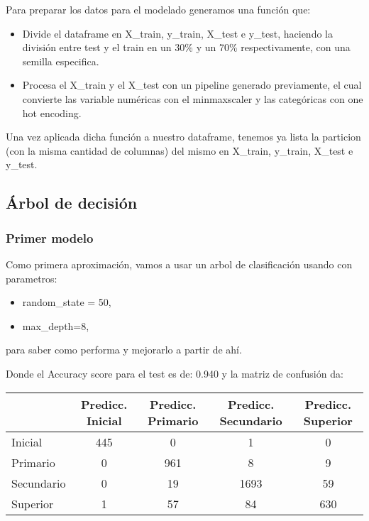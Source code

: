 \documentclass[a4paper]{article}
\begin{document}
        Para preparar los datos para el modelado generamos una función que:
        \begin{itemize}
            \item  Divide el dataframe en X\_train, y\_train, X\_test e y\_test, haciendo la división entre test y el train en un 30\% y un 70\% respectivamente, con una semilla especifica.
            \item  Procesa el X\_train y el X\_test con un pipeline generado previamente, el cual convierte las variable numéricas con el minmaxscaler y las categóricas con one hot encoding.
        \end{itemize}

        Una vez aplicada dicha función a nuestro dataframe, tenemos ya lista la particion (con la misma cantidad de columnas) del mismo en X\_train, y\_train, X\_test e y\_test.

    \subsection{Árbol de decisión}

        \subsubsection{Primer modelo}

            Como primera aproximación, vamos a usar un arbol de clasificación usando con parametros:
            \begin{itemize}
                \item random\_state = 50,
                \item max\_depth=8,
            \end{itemize}
            para saber como performa y mejorarlo a partir de ahí.

            Donde el Accuracy score para el test es de: 0.940 y la matriz de confusión da:
            \begin{table}[H]
                \centering
                \begin{tabular}{|l|c|c|c|c|}
                \hline
                    ~ & Predicc. Inicial & Predicc. Primario & Predicc. Secundario & Predicc. Superior \\ \hline
                    Inicial & 445 & 0 & 1 & 0 \\ \hline
                    Primario & 0 & 961 & 8 & 9 \\ \hline
                    Secundario & 0 & 19 & 1693 & 59 \\ \hline
                    Superior & 1 & 57 & 84 & 630 \\ \hline
                \end{tabular}
            \end{table}
\end{document}
